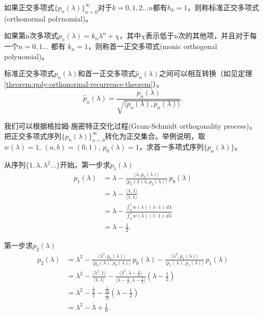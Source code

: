 \begin{subappendices}
如果正交多项式$\{p_n(\lambda)\}_{n=0}^{\infty}$对于$k =0,1,2 \ldots n$都有$h_k = 1$，则称标准正交多项式(orthonormal polynomial)。

如果第n次多项式$p_n(\lambda)=k_n \lambda^n + \chi$，其中$\chi$表示低于n次的其他项，并且对于每一个$n=0,1 \ldots $ 都有 $k_n = 1$，则称首一正交多项式(monic orthogonal polynomial)。

标准正交多项式$p_n(\lambda)$和首一正交多项式$\hat{p}_n(\lambda)$之间可以相互转换（如见定理\ref{theorem:poly-orthonormal-recurrence-theorem}）。
\begin{equation}
  \label{eq:poly-monic-orthonormal-transformation}
  \hat{p}_n(\lambda) = \frac{p_n(\lambda)}{\sqrt{\langle p_n(\lambda), p_n(\lambda)\rangle}}.
\end{equation}

我们可以根据格拉姆-施密特正交化过程(Gram-Schmidt orthogonality process)，把正交多项式序列$\{p_{n}(\lambda)\}_{n=0}^{\infty}$转化为正交集合。举例说明，取$w(\lambda)=1, \, (a,b)=(0,1), \, p_{0}(\lambda)=1$，求首一多项式序列$\{p_{n}(\lambda)\}$。

从序列$\{1,\lambda, \lambda^2 \ldots \}$开始。第一步求$p_1(\lambda)$
\begin{equation*}
  \begin{split}
    p_1(\lambda) &= \lambda - \frac{\langle \lambda, p_{0}(\lambda) \rangle}{\langle p_{0}(\lambda) \lambda, p_{0}(\lambda) \rangle} \, p_0(\lambda) \\
    &= \lambda - \frac{\langle \lambda,1 \rangle }{\langle 1,1 \rangle} \\
    &= \lambda - \frac{
    \int_0^1 w(\lambda) \left(\lambda  \cdot 1 \right) \, d \lambda
    }{
    \int_0^1 w(\lambda) \left(1 \cdot 1 \right) \, d \lambda
    }\\
    &= \lambda - \frac{1}{2}.
  \end{split}
\end{equation*}

  第一步求$p_2(\lambda)$
  \begin{equation*}
    \begin{split}
      p_2(\lambda) &= \lambda^2 - \frac{\langle \lambda^2, p_0(\lambda) \rangle}{\langle p_0(\lambda),p_0(\lambda)\rangle} \, p_0(\lambda)
      - \frac{
      \langle \lambda^2, p_1(\lambda) \rangle
      }{
      \langle p_1(\lambda),p_1(\lambda)\rangle
      } \, p_1(\lambda) \\
      &= \lambda^2 - \frac{
      \langle \lambda^2, 1 \rangle
      }{
      \langle 1,1 \rangle
      } -\frac{
      \langle \lambda^2, \lambda-\frac{1}{2} \rangle
      }{
      \langle \lambda-\frac{1}{2}, \lambda-\frac{1}{2} \rangle
      } \left(\lambda-\frac{1}{2} \right)\\
      &=\lambda^2 - \frac{\frac{1}{3}}{1} - \frac{\frac{1}{12}}{\frac{1}{12}} \left( \lambda - \frac{1}{2} \right) \\
      &=\lambda^2 - \lambda + \frac{1}{6}.
    \end{split}
  \end{equation*}


\end{subappendices}

